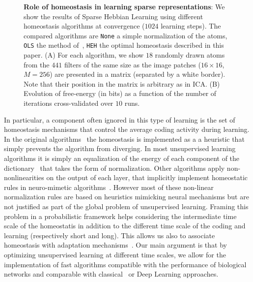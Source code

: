 \documentclass[a4paper, 11pt, draft]{article} %
\begin{document}
\begin{figure}%
\caption{
{\bf Role of homeostasis in learning sparse representations}:
We show the results of Sparse Hebbian Learning using different homeostasis algorithms at convergence ($1024$ learning steps). The compared algorithms are \texttt{None} a simple normalization of the atoms, \texttt{OLS} the method of~\citep{Olshausen97}, \texttt{HEH} the optimal homeostasis described in this paper. {\sf (A)} For each algorithm, we show $18$ randomly drawn atoms from the $441$ filters of the same size as the image patches ($16 \times 16$, $M=256$) are presented in a matrix (separated by a white border). Note that their position in the matrix is arbitrary as in ICA. {\sf (B)} Evolution of free-energy (in bits) as a function of the number of iterations cross-validated over $10$ runs. %
\label{fig:map}}%
\end{figure}%
In particular, a component often ignored in this type of learning is the set of homeostasis mechanisms that control the average coding activity during learning. %
In the original algorithms~\citep{Olshausen97} the homeostasis is implemented as a a heuristic that simply prevents the algorithm from diverging. In most unsupervised learning algorithms it is simply an equalization of the energy of each component of the dictionary~\citep{Mairal11} that takes the form of  normalization. Other algorithms apply non-nonlinearities on the output of each layer, that implicitly implement homeostatic rules in neuro-mimetic algorithms~\citep{Brito16}. However most of these non-linear normalization rules are based on heuristics mimicking neural mechanisms but are not justified as part of the global problem of unsupervised learning.  Framing this problem in a probabilistic framework helps considering the intermediate time scale of the homeostatis in addition to the different time scale of the coding and learning (respectively short and long). This allows us also to associate homeostasis with adaptation mechanisms~\citep{Rao99}. Our main argument is that by optimizing unsupervised learning at different time scales, we allow for the implementation of fast algorithms compatible with the performance of biological networks and comparable with classical~\citep{Olshausen97} or Deep Learning approaches.
\end{document}

